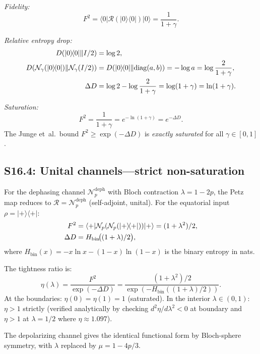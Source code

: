 \documentclass[prl,twocolumn,superscriptaddress,longbibliography]{revtex4-2}
\newcommand{\Petz}{\mathcal{R}}
\newcommand{\chan}{\mathcal{N}}
\newcommand{\ket}[1]{|#1\rangle}
\newcommand{\bra}[1]{\langle#1|}
\begin{document}
\emph{Fidelity:}
\begin{equation}
F^2 = \bra{0}\Petz(\ket{0}\!\bra{0})\ket{0}
= \frac{1}{1+\gamma}.
\end{equation}

\emph{Relative entropy drop:}
\begin{align}
D(\ket{0}\!\bra{0}\|I/2) &= \log 2, \notag\\
D(\chan_\gamma(\ket{0}\!\bra{0})\|\chan_\gamma(I/2))
  &= D(\ket{0}\!\bra{0}\|\mathrm{diag}(a,b))
   = -\log a = \log\frac{2}{1+\gamma}, \notag\\
\Delta D &= \log 2 - \log\frac{2}{1+\gamma}
          = \log(1+\gamma) = \ln(1+\gamma).
\end{align}

\emph{Saturation:}
\begin{equation}
\boxed{F^2 = \frac{1}{1+\gamma} = e^{-\ln(1+\gamma)} = e^{-\Delta D}.}
\end{equation}
The Junge et~al.\ bound $F^2 \geq \exp(-\Delta D)$ is
\emph{exactly saturated} for all $\gamma \in [0,1]$.

\subsection{S16.4: Unital channels---strict non-saturation}

For the dephasing channel $\chan_p^{\mathrm{deph}}$ with Bloch
contraction $\lambda = 1-2p$, the Petz map reduces to
$\Petz = \chan_p^{\mathrm{deph}}$ (self-adjoint, unital).
For the equatorial input $\rho = \ket{+}\!\bra{+}$:
\begin{align}
F^2 &= \bra{+}\chan_p(\chan_p(\ket{+}\!\bra{+}))\ket{+}
     = (1+\lambda^2)/2, \notag\\
\Delta D &= H_{\mathrm{bin}}\!\big((1+\lambda)/2\big),
\end{align}
where $H_{\mathrm{bin}}(x) = -x\ln x - (1-x)\ln(1-x)$ is the
binary entropy in nats.

The tightness ratio is:
\begin{equation}
\eta(\lambda) = \frac{F^2}{\exp(-\Delta D)}
= \frac{(1+\lambda^2)/2}{\exp(-H_{\mathrm{bin}}((1+\lambda)/2))}.
\end{equation}
At the boundaries: $\eta(0) = \eta(1) = 1$ (saturated).
In the interior $\lambda \in (0,1)$: $\eta > 1$ strictly
(verified analytically by checking $d^2\eta/d\lambda^2 < 0$ at
boundary and $\eta > 1$ at $\lambda = 1/2$ where
$\eta \approx 1.097$).

The depolarizing channel gives the identical functional form by
Bloch-sphere symmetry, with $\lambda$ replaced by
$\mu = 1 - 4p/3$.
\end{document}
